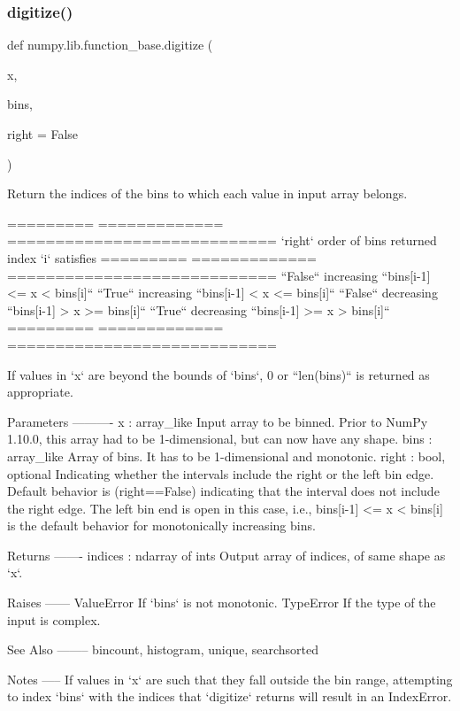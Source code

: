 \subsubsection{\texorpdfstring{digitize()}{digitize()}}
{\footnotesize\ttfamily def numpy.\+lib.\+function\+\_\+base.\+digitize (\begin{DoxyParamCaption}\item[{}]{x,  }\item[{}]{bins,  }\item[{}]{right = {\ttfamily False} }\end{DoxyParamCaption})}

\begin{DoxyVerb}Return the indices of the bins to which each value in input array belongs.

=========  =============  ============================
`right`    order of bins  returned index `i` satisfies
=========  =============  ============================
``False``  increasing     ``bins[i-1] <= x < bins[i]``
``True``   increasing     ``bins[i-1] < x <= bins[i]``
``False``  decreasing     ``bins[i-1] > x >= bins[i]``
``True``   decreasing     ``bins[i-1] >= x > bins[i]``
=========  =============  ============================

If values in `x` are beyond the bounds of `bins`, 0 or ``len(bins)`` is
returned as appropriate.

Parameters
----------
x : array_like
    Input array to be binned. Prior to NumPy 1.10.0, this array had to
    be 1-dimensional, but can now have any shape.
bins : array_like
    Array of bins. It has to be 1-dimensional and monotonic.
right : bool, optional
    Indicating whether the intervals include the right or the left bin
    edge. Default behavior is (right==False) indicating that the interval
    does not include the right edge. The left bin end is open in this
    case, i.e., bins[i-1] <= x < bins[i] is the default behavior for
    monotonically increasing bins.

Returns
-------
indices : ndarray of ints
    Output array of indices, of same shape as `x`.

Raises
------
ValueError
    If `bins` is not monotonic.
TypeError
    If the type of the input is complex.

See Also
--------
bincount, histogram, unique, searchsorted

Notes
-----
If values in `x` are such that they fall outside the bin range,
attempting to index `bins` with the indices that `digitize` returns
will result in an IndexError.


\end{DoxyVerb}
